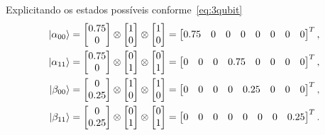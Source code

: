 Explicitando os estados possíveis conforme~\eqref{eq:3qubit}
\begin{equation}
  \begin{split}
    \ket{\alpha_{00}} &= \begin{bmatrix} \num{0.75} \\ 0 \end{bmatrix} \otimes
                     \begin{bmatrix} 1 \\ 0 \end{bmatrix} \otimes
                     \begin{bmatrix} 1 \\ 0 \end{bmatrix} =
                     \begin{bmatrix} \num{0.75} & 0 & 0 & 0 & 0 & 0 & 0 & 0 \end{bmatrix}^T, \\
    \ket{\alpha_{11}} &= \begin{bmatrix} \num{0.75} \\ 0 \end{bmatrix} \otimes
                        \begin{bmatrix} 0 \\ 1 \end{bmatrix} \otimes
                        \begin{bmatrix} 0 \\ 1 \end{bmatrix} =
                        \begin{bmatrix} 0 & 0 & 0 & \num{0.75} & 0 & 0 & 0 & 0 \end{bmatrix}^T, \\
    \ket{\beta_{00}} &= \begin{bmatrix} 0 \\ \num{0.25} \end{bmatrix} \otimes
                    \begin{bmatrix} 1 \\ 0 \end{bmatrix} \otimes
                    \begin{bmatrix} 1 \\ 0 \end{bmatrix} =
                    \begin{bmatrix} 0 & 0 & 0 & 0 & \num{0.25} & 0 & 0 & 0 \end{bmatrix}^T, \\
    \ket{\beta_{11}} &= \begin{bmatrix} 0 \\ \num{0.25} \end{bmatrix} \otimes
                       \begin{bmatrix} 0 \\ 1 \end{bmatrix} \otimes
                       \begin{bmatrix} 0 \\ 1 \end{bmatrix} =
                       \begin{bmatrix} 0 & 0 & 0 & 0 & 0 & 0 & 0 & \num{0.25} \end{bmatrix}^T.
  \end{split}
\end{equation}
